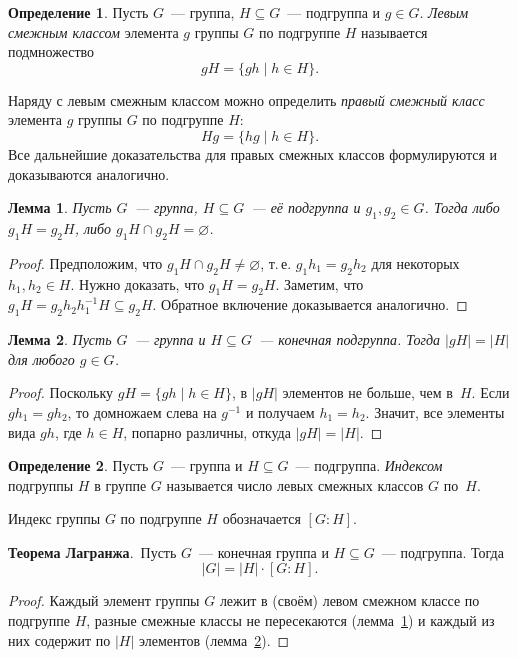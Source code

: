 \documentclass[a4paper, 12pt]{article}
\newtheorem{lemma}{Лемма}
\theoremstyle{definition}
\newtheorem{definition}{Определение}
\theoremstyle{remark}
\begin{document}
\begin{definition}
Пусть $G$~--- группа, $H\subseteq G$~--- подгруппа и $g\in G$. {\it
Левым смежным классом} элемента $g$ группы $G$ по подгруппе $H$
называется подмножество
$$
gH=\{gh \mid h\in H\}.
$$
\end{definition}
Наряду с левым смежным классом можно определить {\it правый смежный
класс} элемента $g$ группы $G$ по подгруппе $H$:
$$
Hg=\{hg \mid h\in H\}.
$$
Все дальнейшие доказательства для правых смежных классов формулируются и доказываются аналогично.

\begin{lemma} \label{l1}
Пусть $G$~--- группа, $H\subseteq G$~--- её подгруппа и $g_1,g_2\in
G$. Тогда либо $g_1H=g_2H$, либо $g_1H\cap g_2H=\varnothing$.
\end{lemma}

\begin{proof}
Предположим, что $g_1H\cap g_2H\ne\varnothing$, т.\,е.
$g_1h_1=g_2h_2$ для некоторых $h_1,h_2\in H$. 
Нужно доказать, что
$g_1H=g_2H$. Заметим, что $g_1H=g_2h_2h_1^{-1}H\subseteq g_2H$.
Обратное включение доказывается аналогично.
\end{proof}

\begin{lemma} \label{l2}
Пусть $G$~--- группа и $H\subseteq G$~--- конечная подгруппа. 
Тогда
$|gH|=|H|$ для любого $g\in G$.
\end{lemma}

\begin{proof}
Поскольку $gH=\{gh \mid h\in H\}$, в $|gH|$ элементов не больше, чем
в~$H$. 
Если $gh_1=gh_2$, то домножаем слева на $g^{-1}$ и получаем
$h_1=h_2$. Значит, все элементы вида $gh$, где $h\in H$, попарно
различны, откуда $|gH|=|H|$.
\end{proof}

\begin{definition}
Пусть $G$~--- группа и $H\subseteq G$~--- подгруппа. {\it Индексом}
подгруппы $H$ в группе $G$ называется число левых смежных классов
$G$ по~$H$.
\end{definition}

Индекс группы $G$ по подгруппе $H$ обозначается $[G:H]$.

\smallskip

{\bf Теорема Лагранжа}.\ Пусть $G$~--- конечная группа и $H\subseteq
G$~--- подгруппа. Тогда
$$
|G| = |H| \cdot [G:H].
$$

\begin{proof}
Каждый элемент группы $G$ лежит в (своём) левом смежном классе по
подгруппе $H$, разные смежные классы не пересекаются
(лемма~\ref{l1}) и каждый из них содержит по $|H|$ элементов
(лемма~\ref{l2}).
\end{proof}
\end{document}
